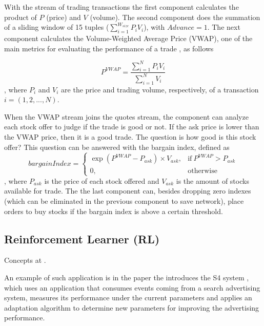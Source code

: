 \documentclass[ppgc,diss,english]{iiufrgs}
\begin{document}
With the stream of trading transactions the first component calculates the product of $P$ (price) and $V$ (volume). The second component does the summation of a sliding window of 15 tuples ($\sum_{i=1}^{W_{size}}P_{i}V_{i}$), with $Advance = 1$. The next component calculates the Volume-Weighted Average Price (VWAP), one of the main metrics for evaluating the performance of a trade \cite{di2010applications, kim2010electronic}, as follows

\begin{equation}
P^{VWAP} = \frac{\sum_{i=1}^{N}P_{i}V_{i}}{\sum_{i=1}^{N}V_{i}}
\end{equation}\cite{kakade2004competitive}, where $P_{i}$ and $V_{i}$ are the price and trading volume, respectively, of a transaction $i = (1,2,...,N)$.

When the VWAP stream joins the quotes stream, the component can analyze each stock offer to judge if the trade is good or not. If the ask price is lower than the VWAP price, then it is a good trade. The question is how good is this stock offer? This question can be answered with the bargain index, defined as
\begin{equation}
bargainIndex = 
\begin{cases}
  \exp(P^{VWAP} - P_{ask}) \times V_{ask}, & \text{if}\ P^{VWAP} > P_{ask} \\
  0, & \text{otherwise}
\end{cases}
\end{equation} \cite{ranganathan2011constructing}, where $P_{ask}$ is the price of each stock offered and $V_{ask}$ is the amount of stocks available for trade. The the last component can, besides dropping zero indexes (which can be eliminated in the previous component to save network), place orders to buy stocks if the bargain index is above a certain threshold.

\subsection{Reinforcement Learner (RL)}

Concepts at \cite{strehl2008analysis}.

An example of such application is in the paper the introduces the S4 system \cite{neumeyer2010s4}, which uses an application that consumes events coming from a search advertising system, measures its performance under the current parameters and applies an adaptation algorithm to determine new parameters for improving the advertising performance.
\end{document}
